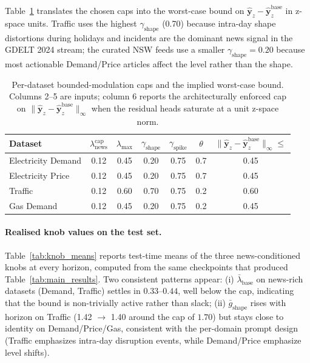 \documentclass{article}
\begin{document}
Table~\ref{tab:sensitivity_caps} translates the chosen caps into the worst-case bound on $\hat{\bm y}_z\!-\!\hat{\bm y}^{\text{base}}_z$ in z-space units. Traffic uses the highest $\gamma_{\text{shape}}$ (0.70) because intra-day shape distortions during holidays and incidents are the dominant news signal in the GDELT 2024 stream; the curated NSW feeds use a smaller $\gamma_{\text{shape}}{=}0.20$ because most actionable Demand/Price articles affect the level rather than the shape.

\begin{table}[h]
\centering
\caption{Per-dataset bounded-modulation caps and the implied worst-case bound. Columns 2--5 are inputs; column 6 reports the architecturally enforced cap on $\|\hat{\bm{y}}_z{-}\hat{\bm{y}}^{\text{base}}_z\|_\infty$ when the residual heads saturate at a unit z-space norm.}
\label{tab:sensitivity_caps}
\scriptsize
\setlength{\tabcolsep}{6pt}
\renewcommand{\arraystretch}{1.05}
\begin{tabular}{lcccccc}
\toprule
\textbf{Dataset} & $\lambda_{\text{news}}^{\text{cap}}$ & $\lambda_{\max}$ & $\gamma_{\text{shape}}$ & $\gamma_{\text{spike}}$ & $\theta$ & $\|\hat{\bm{y}}_z{-}\hat{\bm{y}}^{\text{base}}_z\|_\infty\!\le$ \\
\midrule
Electricity Demand & 0.12 & 0.45 & 0.20 & 0.75 & 0.7 & 0.45 \\
Electricity Price  & 0.12 & 0.45 & 0.20 & 0.75 & 0.7 & 0.45 \\
Traffic            & 0.12 & 0.60 & 0.70 & 0.75 & 0.2 & 0.60 \\
Gas Demand         & 0.12 & 0.45 & 0.20 & 0.75 & 0.2 & 0.45 \\
\bottomrule
\end{tabular}
\end{table}

\paragraph{Realised knob values on the test set.}
Table~\ref{tab:knob_means} reports test-time means of the three news-conditioned knobs at every horizon, computed from the same checkpoints that produced Table~\ref{tab:main_results}. Two consistent patterns appear: (i) $\bar\lambda_{\text{base}}$ on news-rich datasets (Demand, Traffic) settles in $0.33$--$0.44$, well below the cap, indicating that the bound is non-trivially active rather than slack; (ii) $\bar g_{\text{shape}}$ rises with horizon on Traffic (1.42 $\to$ 1.40 around the cap of $1.70$) but stays close to identity on Demand/Price/Gas, consistent with the per-domain prompt design (Traffic emphasizes intra-day disruption events, while Demand/Price emphasize level shifts).
\end{document}
